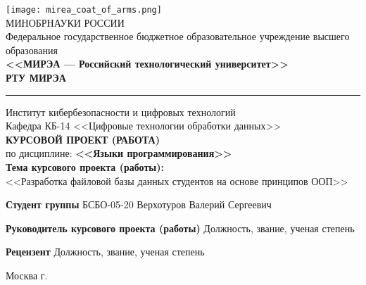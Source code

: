 \documentclass[14pt, a4paper, titlepage]{extarticle}
\begin{document}
\begin{titlepage}
    \begin{center}
        \texttt{[image: mirea\_coat\_of\_arms.png]} \\
        МИНОБРНАУКИ РОССИИ \\ 
        Федеральное государственное бюджетное образовательное учреждение высшего образования \\
        \textbf{<<МИРЭА --- Российский технологический университет>>} \\
        \textbf{РТУ МИРЭА}
        \rule{\textwidth}{1pt}
        Институт кибербезопасности и цифровых технологий \\
        Кафедра КБ-14 <<Цифровые технологии обработки данных>> \\ \bigskip
        \fontsize{16pt}{16pt}\selectfont
        \textbf{КУРСОВОЙ ПРОЕКТ (РАБОТА)} \\ \bigskip \bigskip
        по дисциплине: \textbf{<<Языки программирования>>} \\ \bigskip \bigskip
        \textbf{Тема курсового проекта (работы):} \\
        <<Разработка файловой базы данных студентов на основе принципов ООП>>
    \end{center}
    \noindent\textbf{Студент группы} {\fontsize{16pt}{16pt}\selectfont БСБО-05-20 Верхотуров Валерий Сергеевич}\par
    \noindent\textbf{Руководитель курсового проекта (работы)} {\fontsize{16pt}{16pt}\selectfont Должность, звание, ученая степень}\par
    \noindent\textbf{Рецензент} {\fontsize{16pt}{16pt}\selectfont Должность, звание, ученая степень}\par
    \centering\vfill 
    Москва \the\year{} г.
\end{titlepage}
\end{document}
